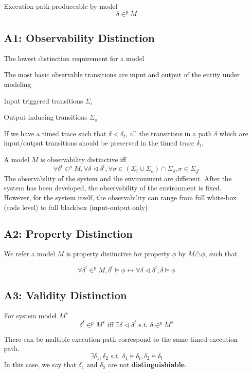 Execution path produceable by model
$$\delta\in^p M$$
\subsection{A1: Observability Distinction}
The lowest distinction requirement for a model

The most basic observable transitions are input and output of the entity under modeling

Input triggered transitions $\Sigma_i$

Output inducing transitions $\Sigma_o$

If we have a timed trace such that $\delta\triangleleft\delta_t$, all the transitions in a path $\delta$ which are input/output transitions should be preserved in the timed trace $\delta_t$. 

A model $M$ is observability distinctive iff
$$\forall\delta^t\in^p M, \forall\delta\triangleleft\delta^t,\forall \sigma\in(\Sigma_i\cup\Sigma_o)\cap\Sigma_\delta,\sigma\in\Sigma_{\delta^t}$$
The observability of the system and the environment are different. After the system has been developed, the observability of the environment is fixed. However, for the system itself, the observability can range from full white-box (code level) to full blackbox (input-output only)

\subsection{A2: Property Distinction}
We refer a model $M$ is property distinctive for property $\phi$ by $M\triangle\phi$, such that

$$\forall \delta^t\in^p M, \delta^t\models\phi\leftrightarrow\forall \delta\triangleleft\delta^t,  \delta\models\phi$$

\subsection{A3: Validity Distinction}


For system model $M^s$
$$\delta^t\in^p M^s \text{ iff }\exists\delta\triangleleft\delta^t\text{ s.t. } \delta\in^p M^s$$


There can be multiple execution path correspond to the same timed execution path. 
$$\exists \delta_1,\delta_2\text{ s.t. } \delta_1\models\delta_t,\delta_2\models\delta_t$$
In this case, we say that $\delta_1$ and $\delta_2$ are not \textbf{distinguishiable}. 

